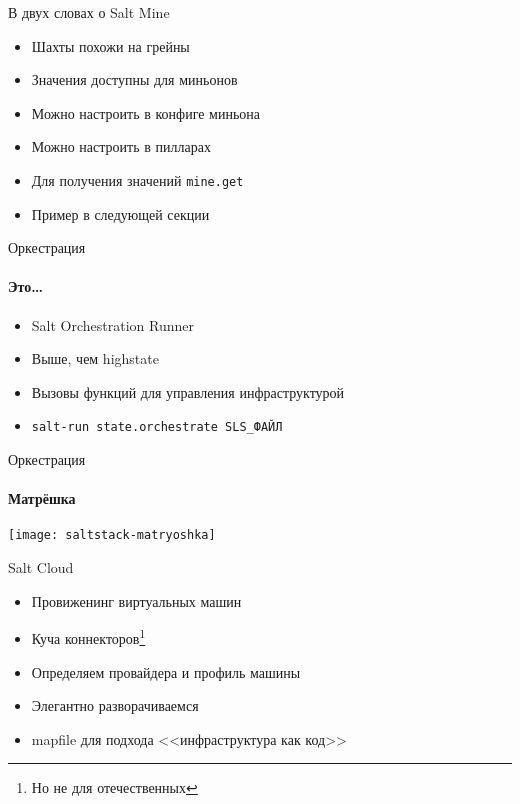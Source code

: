 \liveframe{}

\begin{Frame}{В двух словах о Salt Mine}
  \begin{itemize}[<+-| alert@ +>]
    \item Шахты похожи на грейны
    \item Значения доступны для миньонов
    \item Можно настроить в конфиге миньона
    \item Можно настроить в пилларах
    \item Для получения значений \texttt{mine.get}
    \item[\faAngleDoubleRight] Пример в следующей секции
  \end{itemize}
\end{Frame}

\begin{Frame}{Оркестрация}
  \framesubtitle{Это\dots}

  \ExampleNote{}

  \begin{itemize}[<+-| alert@ +>]
    \item[\faRunning] Salt Orchestration Runner
    \item[\faMountain] Выше, чем highstate
    \item[\faBullhorn] Вызовы функций для управления инфраструктурой
    \item[\faTerminal] \texttt{salt-run state.orchestrate SLS\_ФАЙЛ}
  \end{itemize}
\end{Frame}

\begin{frame}{Оркестрация}
  \framesubtitle{Матрёшка}
  \centering
  \texttt{[image: saltstack-matryoshka]}
\end{frame}

\liveframe{}

\begin{Frame}{Salt Cloud}
  \begin{itemize}[<+-| alert@ +>]
    \item[\faCloud] Провиженинг виртуальных машин
    \item[\faCogs] Куча коннекторов\footnote<2->{Но не для отечественных
      \faCloud\faCloud\faMeh[regular]}
    \item[{\faFileCode[regular]}] Определяем провайдера и профиль машины
    \item[\faServer] Элегантно разворачиваемся
    \item[{\faMap[regular]}] mapfile для подхода <<инфраструктура как код>>
  \end{itemize}
\end{Frame}

